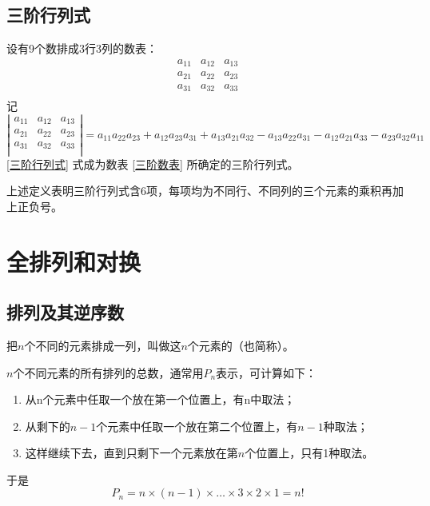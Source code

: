 \subsection{三阶行列式}

\begin{定义}
	设有9个数排成3行3列的数表：
	\begin{equation} \label{三阶数表}
		\begin{array}{ccc}
			a_{11} & a_{12} & a_{13}\\
			a_{21} & a_{22} & a_{23}\\
			a_{31} & a_{32} & a_{33}\\
		\end{array}
	\end{equation}
	记
	\begin{equation} \label{三阶行列式}
	\left |
		\begin{array}{ccc}
		a_{11} & a_{12} & a_{13}\\
		a_{21} & a_{22} & a_{23}\\
		a_{31} & a_{32} & a_{33}\\
		\end{array}\right |
		=a_{11}a_{22}a_{23}+a_{12}a_{23}a_{31}+a_{13}a_{21}a_{32}-a_{13}a_{22}a_{31}-a_{12}a_{21}a_{33}-a_{23}a_{32}a_{11}
	\end{equation}	
	\ref{三阶行列式} 式成为数表 \ref{三阶数表} 所确定的三阶行列式。
\end{定义}

上述定义表明三阶行列式含6项，每项均为不同行、不同列的三个元素的乘积再加上正负号。

\section{全排列和对换}

\subsection{排列及其逆序数}

把$ n $个不同的元素排成一列，叫做这$ n $个元素的（也简称）。

$ n $个不同元素的所有排列的总数，通常用$ P_{n} $表示，可计算如下：
\begin{enumerate}
	\item 从n个元素中任取一个放在第一个位置上，有n中取法；
	\item 从剩下的$ n-1 $个元素中任取一个放在第二个位置上，有$ n-1 $种取法；
	\item 这样继续下去，直到只剩下一个元素放在第$ n $个位置上，只有1种取法。
\end{enumerate}
于是
\begin{equation}
	P_{n} = n \times (n-1) \times \dots \times 3 \times 2 \times 1 = n!
\end{equation}

